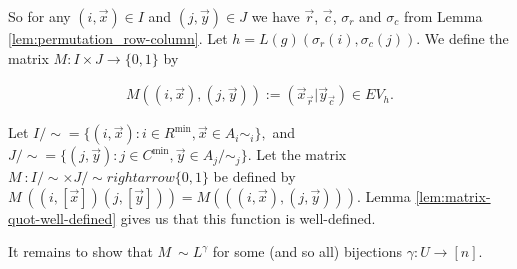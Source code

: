 \documentclass[../paper.tex]{subfiles}
\begin{document}
So for any $(i, \vec{x}) \in I$ and $(j, \vec{y}) \in J$ we have $\vec{r}$,
$\vec{c}$, $\sigma_r$ and $\sigma_c$ from Lemma \ref{lem:permutation_row-column}.
Let $h = L(g)(\sigma_r(i), \sigma_c (j))$. We define the matrix $M : I \times J
\rightarrow \{0,1\}$ by

\begin{align*}
  M((i , \vec{x}), (j, \vec{y})) := (\vec{x}_{\vec{r}} \vert \vec{y}_{\vec{c}}) \in EV_h.
\end{align*}

Let $I /{\sim} = \{(i, \vec{x}): i \in R^{\min}, \vec{x} \in A_i{\sim_i}\},$ and
$J/{\sim} = \{(j, \vec{y}): j \in C^{\min}, \vec{y} \in A_j/{\sim_j}\}$. Let the
matrix $M_{~} : I /{\sim} \times J / {\sim} rightarrow \{0,1\}$ be defined by
$M_{~} ((i, [\vec{x}]) (j, [\vec{y}])) = M(((i, \vec{x}), (j, \vec{y})))$. Lemma
\ref{lem:matrix-quot-well-defined} gives us that this function is well-defined.

It remains to show that $M_{~} \sim L^{\gamma}$ for some (and so all) bijections
$\gamma: U \rightarrow [n]$.


\end{document}
